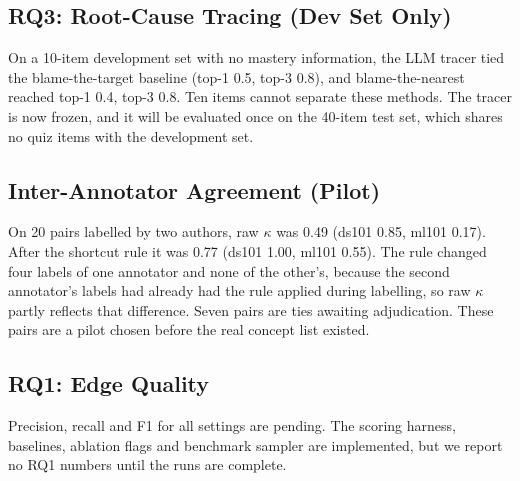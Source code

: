 \documentclass[conference]{IEEEtran}
\begin{document}
\subsection{RQ3: Root-Cause Tracing (Dev Set Only)}
On a 10-item development set with no mastery information, the LLM tracer tied the blame-the-target baseline (top-1 0.5, top-3 0.8), and blame-the-nearest reached top-1 0.4, top-3 0.8. Ten items cannot separate these methods. The tracer is now frozen, and it will be evaluated once on the 40-item test set, which shares no quiz items with the development set.

\subsection{Inter-Annotator Agreement (Pilot)}
On 20 pairs labelled by two authors, raw $\kappa$ was 0.49 (ds101 0.85, ml101 0.17). After the shortcut rule it was 0.77 (ds101 1.00, ml101 0.55). The rule changed four labels of one annotator and none of the other's, because the second annotator's labels had already had the rule applied during labelling, so raw $\kappa$ partly reflects that difference. Seven pairs are ties awaiting adjudication. These pairs are a pilot chosen before the real concept list existed.

\subsection{RQ1: Edge Quality}
Precision, recall and F1 for all settings are pending. The scoring harness, baselines, ablation flags and benchmark sampler are implemented, but we report no RQ1 numbers until the runs are complete.
\end{document}
